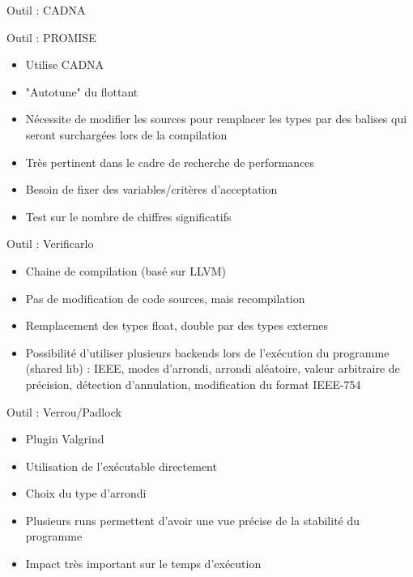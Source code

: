\documentclass{beamer}
\begin{document}
    \begin{frame}{Outil : CADNA}
\cadnasample
  \end{frame}
  
    \begin{frame}{Outil : PROMISE}
        \begin{itemize}
    \item Utilise CADNA
    \item "Autotune" du flottant
    \item Nécessite de modifier les sources pour remplacer les types par des balises qui seront surchargées lors de la compilation
    \item Très pertinent dans le cadre de recherche de performances
    \item Besoin de fixer des variables/critères d'acceptation
    \item Test sur le nombre de chiffres significatifs
    \end{itemize}
  \end{frame}

  
      \begin{frame}{Outil : Verificarlo}
\begin{itemize}
\item Chaine de compilation (basé sur LLVM)
\item Pas de modification de code sources, mais recompilation
\item Remplacement des types float, double par des types externes
\item Possibilité d'utiliser plusieurs backends lors de l'exécution du programme (shared lib) : IEEE, modes d'arrondi, arrondi aléatoire, valeur arbitraire de précision, détection d'annulation, modification du format IEEE-754
\end{itemize}
  \end{frame}
    
      
    \begin{frame}{Outil : Verrou/Padlock}
\begin{itemize}
\item Plugin Valgrind
\item Utilisation de l'exécutable directement
\item Choix du type d'arrondi
\item Plusieurs runs permettent d'avoir une vue précise de la stabilité du programme
\item Impact très important sur le temps d'exécution
\end{itemize}
  \end{frame}
    
\end{document}

